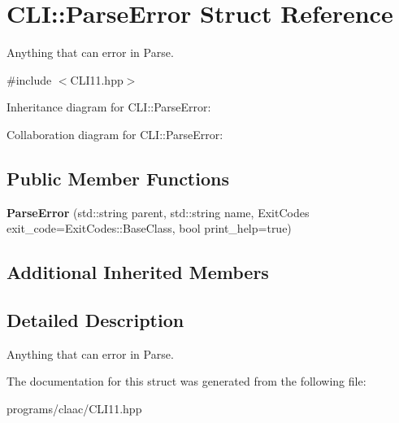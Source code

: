 \hypertarget{struct_c_l_i_1_1_parse_error}{}\section{C\+LI\+:\+:Parse\+Error Struct Reference}
\label{struct_c_l_i_1_1_parse_error}


Anything that can error in Parse.  




{\ttfamily \#include $<$C\+L\+I11.\+hpp$>$}



Inheritance diagram for C\+LI\+:\+:Parse\+Error\+:


Collaboration diagram for C\+LI\+:\+:Parse\+Error\+:
\subsection*{Public Member Functions}
\begin{DoxyCompactItemize}
\item 
\mbox{\label{struct_c_l_i_1_1_parse_error_ae379a574967c6e9734f859b327c4507e}} 
{\bfseries Parse\+Error} (std\+::string parent, std\+::string name, Exit\+Codes exit\+\_\+code=Exit\+Codes\+::\+Base\+Class, bool print\+\_\+help=true)
\end{DoxyCompactItemize}
\subsection*{Additional Inherited Members}


\subsection{Detailed Description}
Anything that can error in Parse. 

The documentation for this struct was generated from the following file\+:\begin{DoxyCompactItemize}
\item 
programs/claac/C\+L\+I11.\+hpp\end{DoxyCompactItemize}
